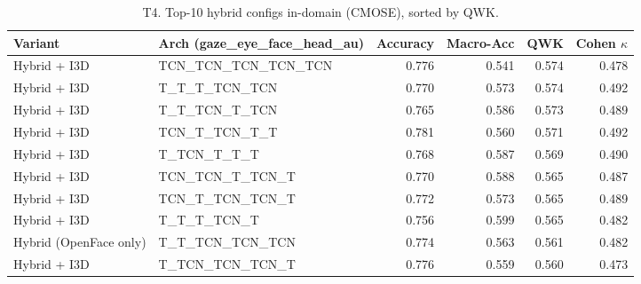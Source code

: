 \begin{table}[ht]
\centering
\caption{T4. Top-10 hybrid configs in-domain (CMOSE), sorted by QWK.}
\label{tab:T4_hybrid_topk}
\begin{tabular}{llrrrr}
\toprule
Variant & Arch (gaze\_eye\_face\_head\_au) & Accuracy & Macro-Acc & QWK & Cohen $\kappa$ \\
\midrule
Hybrid + I3D & TCN\_TCN\_TCN\_TCN\_TCN & 0.776 & 0.541 & 0.574 & 0.478 \\
Hybrid + I3D & T\_T\_T\_TCN\_TCN & 0.770 & 0.573 & 0.574 & 0.492 \\
Hybrid + I3D & T\_T\_TCN\_T\_TCN & 0.765 & 0.586 & 0.573 & 0.489 \\
Hybrid + I3D & TCN\_T\_TCN\_T\_T & 0.781 & 0.560 & 0.571 & 0.492 \\
Hybrid + I3D & T\_TCN\_T\_T\_T & 0.768 & 0.587 & 0.569 & 0.490 \\
Hybrid + I3D & TCN\_TCN\_T\_TCN\_T & 0.770 & 0.588 & 0.565 & 0.487 \\
Hybrid + I3D & TCN\_T\_TCN\_TCN\_T & 0.772 & 0.573 & 0.565 & 0.489 \\
Hybrid + I3D & T\_T\_T\_TCN\_T & 0.756 & 0.599 & 0.565 & 0.482 \\
Hybrid (OpenFace only) & T\_T\_TCN\_TCN\_TCN & 0.774 & 0.563 & 0.561 & 0.482 \\
Hybrid + I3D & T\_TCN\_TCN\_TCN\_T & 0.776 & 0.559 & 0.560 & 0.473 \\
\bottomrule
\end{tabular}
\end{table}
